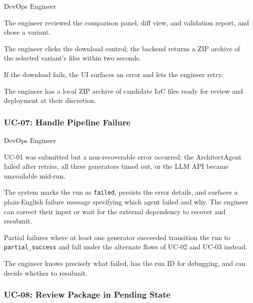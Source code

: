 \begin{description}[leftmargin=3.5cm, style=nextline]
  \item[Actor] DevOps Engineer
  \item[Precondition] The engineer reviewed the comparison panel, diff view,
    and validation report, and chose a variant.
  \item[Main Flow] The engineer clicks the download control; the backend
    returns a ZIP archive of the selected variant's files within two seconds.
  \item[Alternate Flow] If the download fails, the UI surfaces an error and
    lets the engineer retry.
  \item[Postcondition] The engineer has a local ZIP archive of candidate IaC
    files ready for review and deployment at their discretion.
\end{description}

\subsubsection*{UC-07: Handle Pipeline Failure}

\begin{description}[leftmargin=3.5cm, style=nextline]
  \item[Actor] DevOps Engineer
  \item[Precondition] UC-01 was submitted but a non-recoverable error
    occurred: the ArchitectAgent failed after retries, all three generators
    timed out, or the LLM API became unavailable mid-run.
  \item[Main Flow] The system marks the run as \texttt{failed}, persists
    the error details, and surfaces a plain-English failure message
    specifying which agent failed and why. The engineer can correct their
    input or wait for the external dependency to recover and resubmit.
  \item[Alternate Flow] Partial failures where at least one generator
    succeeded transition the run to \texttt{partial\_success} and fall
    under the alternate flows of UC-02 and UC-03 instead.
  \item[Postcondition] The engineer knows precisely what failed, has the
    run ID for debugging, and can decide whether to resubmit.
\end{description}

\subsubsection*{UC-08: Review Package in Pending State}

